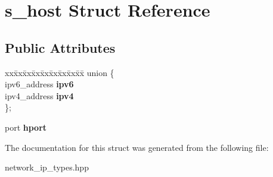 \hypertarget{structs__host}{}\section{s\+\_\+host Struct Reference}
\label{structs__host}
\subsection*{Public Attributes}
\begin{DoxyCompactItemize}
\item 
\mbox{\label{structs__host_ab70be45f69118b58bfef83d602dea7f0}} 
\begin{tabbing}
xx\=xx\=xx\=xx\=xx\=xx\=xx\=xx\=xx\=\kill
union \{\\
\>ipv6\_address {\bfseries ipv6}\\
\>ipv4\_address {\bfseries ipv4}\\
\}; \\

\end{tabbing}\item 
\mbox{\label{structs__host_ae9b1efdcd63ad03473d939bd2ae5ebdf}} 
port {\bfseries hport}
\end{DoxyCompactItemize}


The documentation for this struct was generated from the following file\+:\begin{DoxyCompactItemize}
\item 
network\+\_\+ip\+\_\+types.\+hpp\end{DoxyCompactItemize}
